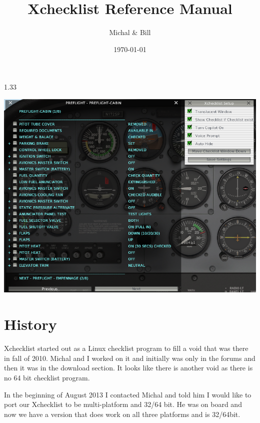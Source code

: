 \documentclass[11pt,parskip=half,a4paper]{scrartcl}
\begin{document}
\title{Xchecklist Reference Manual}
\author{Michal \& Bill}
\date{\today}

\maketitle

\begin{center}
1.33
\end{center}

\vspace{2cm}


\begin{center}
\includegraphics[width=15cm]{TranslucentXchecklist.png}
\end{center}


\thispagestyle{empty}
\newpage
\verb||
\tableofcontents

\newpage
\section{History}

Xchecklist started out as a Linux checklist program to fill a void that was there in fall of 2010. Michal and I worked on it and initially was only in the forums and then it was in the download section. It looks like there is another void as there is no 64 bit checklist program. \newline

In the beginning of August 2013 I contacted Michal and told him I would like to port our Xchecklist to be multi-platform and 32/64 bit. He was on board and now we have a version that does work on all three platforms and is 32/64bit.
\end{document}
